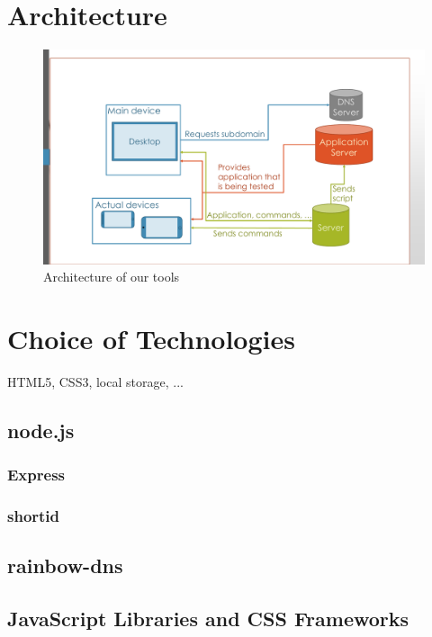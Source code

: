 \section{Architecture}

\begin{figure}[H]
  \centering
    \includegraphics[width=1.0\textwidth]{images/architecture.pdf}
	\caption{Architecture of our tools}
	\label{fig:architecture}
\end{figure}

\section{Choice of Technologies}

HTML5, CSS3, local storage, ...

\subsection{node.js}

\subsubsection{Express}

\subsubsection{shortid}

\subsection{rainbow-dns}

\subsection{JavaScript Libraries and CSS Frameworks}

